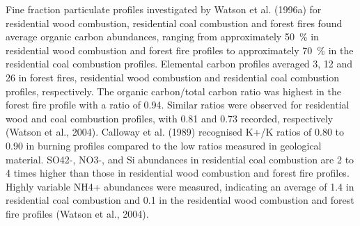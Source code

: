 \documentclass{nwureport}
\begin{document}
Fine fraction particulate profiles investigated by Watson et al. (1996a) for residential wood combustion, residential coal combustion and forest fires found average organic carbon abundances, ranging from approximately \SI{50}{\percent} in residential wood combustion and forest fire profiles to approximately \SI{70}{\percent} in the residential coal combustion profiles. Elemental carbon profiles averaged \SI{3}{\perent}, \SI{12}{\perent} and \SI{26}{\perent} in forest fires, residential wood combustion and residential coal combustion profiles, respectively. The organic carbon/total carbon ratio was highest in the forest fire profile with a ratio of \num{0.94}. Similar ratios were observed for residential wood and coal combustion profiles, with \num{0.81} and \num{0.73} recorded, respectively (Watson et al., 2004). Calloway et al. (1989) recognised K+/K ratios of \num{0.80} to \num{0.90} in burning profiles compared to the low ratios measured in geological material. SO42-, NO3-, and Si abundances in residential coal combustion are \num{2} to \num{4} times higher than those in residential wood combustion and forest fire profiles. Highly variable NH4+ abundances were measured, indicating an average of \SI{1.4}{\perent} in residential coal combustion and \SI{0.1}{\perent} in the residential wood combustion and forest fire profiles (Watson et al., 2004).
\end{document}

